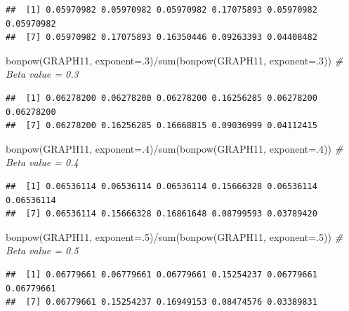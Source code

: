 \documentclass[
  notitlepage,
  onecolumn,
  openany]{book}
\newenvironment{Shaded}{\begin{snugshade}}{\end{snugshade}}
\newcommand{\AttributeTok}[1]{\textcolor[rgb]{0.77,0.63,0.00}{#1}}
\newcommand{\CommentTok}[1]{\textcolor[rgb]{0.56,0.35,0.01}{\textit{#1}}}
\newcommand{\DecValTok}[1]{\textcolor[rgb]{0.00,0.00,0.81}{#1}}
\newcommand{\FunctionTok}[1]{\textcolor[rgb]{0.00,0.00,0.00}{#1}}
\newcommand{\NormalTok}[1]{#1}
\newcommand{\SpecialCharTok}[1]{\textcolor[rgb]{0.00,0.00,0.00}{#1}}
\begin{document}
\begin{verbatim}
##  [1] 0.05970982 0.05970982 0.05970982 0.17075893 0.05970982 0.05970982
##  [7] 0.05970982 0.17075893 0.16350446 0.09263393 0.04408482
\end{verbatim}

\begin{Shaded}
\begin{Highlighting}[]
\FunctionTok{bonpow}\NormalTok{(GRAPH11, }\AttributeTok{exponent=}\NormalTok{.}\DecValTok{3}\NormalTok{)}\SpecialCharTok{/}\FunctionTok{sum}\NormalTok{(}\FunctionTok{bonpow}\NormalTok{(GRAPH11, }\AttributeTok{exponent=}\NormalTok{.}\DecValTok{3}\NormalTok{)) }\CommentTok{\# Beta value = 0.3}
\end{Highlighting}
\end{Shaded}

\begin{verbatim}
##  [1] 0.06278200 0.06278200 0.06278200 0.16256285 0.06278200 0.06278200
##  [7] 0.06278200 0.16256285 0.16668815 0.09036999 0.04112415
\end{verbatim}

\begin{Shaded}
\begin{Highlighting}[]
\FunctionTok{bonpow}\NormalTok{(GRAPH11, }\AttributeTok{exponent=}\NormalTok{.}\DecValTok{4}\NormalTok{)}\SpecialCharTok{/}\FunctionTok{sum}\NormalTok{(}\FunctionTok{bonpow}\NormalTok{(GRAPH11, }\AttributeTok{exponent=}\NormalTok{.}\DecValTok{4}\NormalTok{)) }\CommentTok{\# Beta value = 0.4}
\end{Highlighting}
\end{Shaded}

\begin{verbatim}
##  [1] 0.06536114 0.06536114 0.06536114 0.15666328 0.06536114 0.06536114
##  [7] 0.06536114 0.15666328 0.16861648 0.08799593 0.03789420
\end{verbatim}

\begin{Shaded}
\begin{Highlighting}[]
\FunctionTok{bonpow}\NormalTok{(GRAPH11, }\AttributeTok{exponent=}\NormalTok{.}\DecValTok{5}\NormalTok{)}\SpecialCharTok{/}\FunctionTok{sum}\NormalTok{(}\FunctionTok{bonpow}\NormalTok{(GRAPH11, }\AttributeTok{exponent=}\NormalTok{.}\DecValTok{5}\NormalTok{)) }\CommentTok{\# Beta value = 0.5}
\end{Highlighting}
\end{Shaded}

\begin{verbatim}
##  [1] 0.06779661 0.06779661 0.06779661 0.15254237 0.06779661 0.06779661
##  [7] 0.06779661 0.15254237 0.16949153 0.08474576 0.03389831
\end{verbatim}
\end{document}
